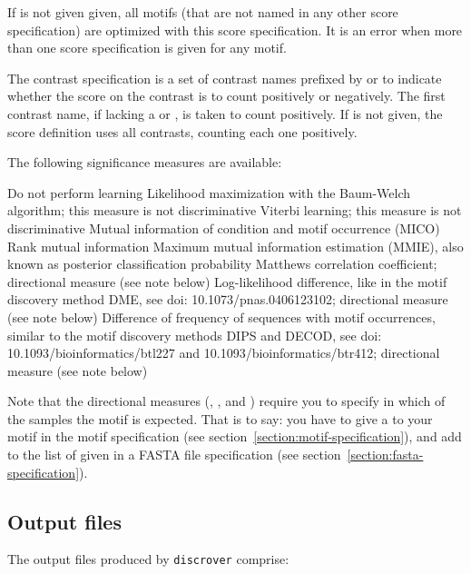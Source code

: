 \documentclass[a4paper]{article}
\newcommand{\discrover}[0]{\texttt{discrover}}
\begin{document}
If  is not given given, all motifs (that are not named in any other score specification) are optimized with this score specification.
It is an error when more than one score specification is given for any motif.

The contrast specification  is a set of contrast names prefixed by \Q{+} or \Q{-} to indicate whether the score on the contrast is to count positively or negatively.
The first contrast name, if lacking a \Q{+} or \Q{-}, is taken to count positively.
If  is not given, the score definition uses all contrasts, counting each one positively.

The following significance measures are available:

\begin{description}
    Do not perform learning
    Likelihood maximization with the Baum-Welch algorithm; this measure is not discriminative
    Viterbi learning; this measure is not discriminative
    Mutual information of condition and motif occurrence (MICO)
    Rank mutual information
    Maximum mutual information estimation (MMIE), also known as posterior classification probability
    Matthews correlation coefficient; directional measure (see note below)
    Log-likelihood difference, like in the motif discovery method DME, see doi: 10.1073/pnas.0406123102; directional measure (see note below)
    Difference of frequency of sequences with motif occurrences, similar to the motif discovery methods DIPS and DECOD, see doi: 10.1093/bioinformatics/btl227 and 10.1093/bioinformatics/btr412; directional measure (see note below)
\end{description}
Note that the directional measures (, , and ) require you to specify in which of the samples the motif is expected.
That is to say: you have to give a  to your motif in the motif specification (see section~\ref{section:motif-specification}), and add  to the list of  given in a FASTA file specification (see section~\ref{section:fasta-specification}).

\subsection{Output files}
The output files produced by \discrover{} comprise:
\end{document}
